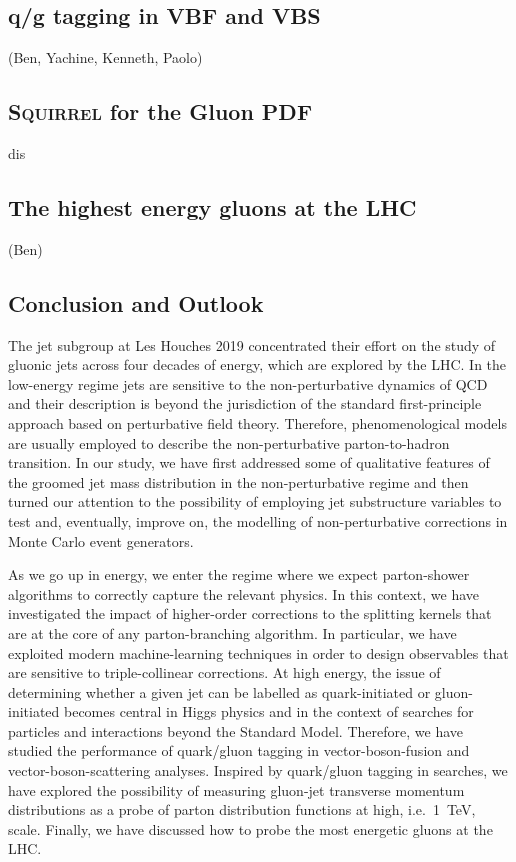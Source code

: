 \documentclass[11pt]{cernrep}
\begin{document}




\subsection{q/g tagging in VBF and VBS}
\label{sec:jets:vbsbvf}
(Ben, Yachine, Kenneth, Paolo)



\subsection{\textsc{Squirrel} for the Gluon PDF}
\label{sec:jets:pdf}

dis

\subsection{The highest energy gluons at the LHC}
\label{sec:jets:highest}
(Ben)

\subsection{Conclusion and Outlook}
\label{sec:jets:conclusion}
The jet subgroup at Les Houches 2019 concentrated their effort on the study of gluonic jets across four decades of energy, which are explored by the LHC. 
%
In the low-energy regime jets are sensitive to the non-perturbative dynamics of QCD and their description is beyond the jurisdiction of the standard first-principle approach based on perturbative field theory. Therefore, phenomenological models are usually employed to describe the non-perturbative parton-to-hadron transition. 
%
In our study, we have first addressed some of qualitative features of the groomed jet mass distribution in the non-perturbative regime and then turned our attention to the possibility of employing jet substructure variables to test and, eventually, improve on, the modelling of non-perturbative corrections in Monte Carlo event generators. 

As we go up in energy, we enter the regime where we expect parton-shower algorithms to correctly capture the relevant physics. In this context, we have investigated the impact of higher-order corrections to the splitting kernels that are at the core of any parton-branching algorithm. In particular, we have exploited modern machine-learning techniques in order to design observables that are sensitive to triple-collinear corrections. 
%
At high energy, the issue of determining whether a given jet can be labelled as quark-initiated or gluon-initiated becomes central in Higgs physics and in the context of searches for particles and interactions beyond the Standard Model. Therefore, we have studied the performance of quark/gluon tagging in vector-boson-fusion and vector-boson-scattering analyses. Inspired by quark/gluon tagging in searches, we have explored the possibility of measuring gluon-jet transverse momentum distributions as a probe of parton distribution functions at high, i.e.\ 1~TeV, scale.
%
Finally, we have discussed how to probe the most energetic gluons at the LHC.
\end{document}
